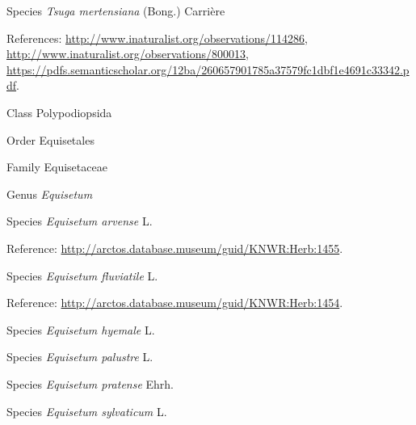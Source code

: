 \documentclass[9pt, article]{memoir}
\begin{document}
\begin{multicols}{2}
\vspace{6pt}\noindent\hspace{36pt}Species \textit{Tsuga mertensiana} (Bong.) Carrière


\vspace{6pt}References: 
\url{http://www.inaturalist.org/observations/114286}, 
\url{http://www.inaturalist.org/observations/800013}, 
\url{https://pdfs.semanticscholar.org/12ba/260657901785a37579fc1dbf1e4691c33342.pdf}.

\vspace{6pt}\noindent\hspace{12pt}Class Polypodiopsida


\vspace{6pt}\noindent\hspace{18pt}Order Equisetales


\vspace{6pt}\noindent\hspace{24pt}Family Equisetaceae


\vspace{6pt}\noindent\hspace{30pt}Genus \textit{Equisetum}


\vspace{6pt}\noindent\hspace{36pt}Species \textit{Equisetum arvense} L.


\vspace{6pt}Reference: 
\url{http://arctos.database.museum/guid/KNWR:Herb:1455}.

\vspace{6pt}\noindent\hspace{36pt}Species \textit{Equisetum fluviatile} L.


\vspace{6pt}Reference: 
\url{http://arctos.database.museum/guid/KNWR:Herb:1454}.

\vspace{6pt}\noindent\hspace{36pt}Species \textit{Equisetum hyemale} L.


\vspace{6pt}\noindent\hspace{36pt}Species \textit{Equisetum palustre} L.


\vspace{6pt}\noindent\hspace{36pt}Species \textit{Equisetum pratense} Ehrh.


\vspace{6pt}\noindent\hspace{36pt}Species \textit{Equisetum sylvaticum} L.



\end{multicols}
\end{document}
